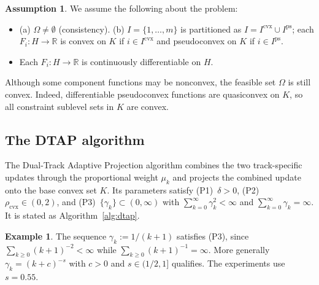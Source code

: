 \documentclass[]{interact}
\theoremstyle{plain}
\theoremstyle{definition}
\newtheorem{example}[theorem]{Example}
\newtheorem{assumption}{Assumption}
\theoremstyle{remark}
\newcommand{\R}{\mathbb{R}}
\newcommand{\cvx}{\mathrm{cvx}}
\newcommand{\ps}{\mathrm{ps}}
\begin{document}
\begin{assumption}\label{ass:standing}
We assume the following about the problem:
\begin{itemize}[leftmargin=2.4em,itemsep=2pt]
\item[\textup{(A1)}] \textup{(a)} $\Omega\ne\emptyset$ (consistency). \textup{(b)} $I=\{1,\dots,m\}$
is partitioned as $I=I^{\cvx}\cup I^{\ps}$; each $F_i:H\to\R$ is convex on $K$ if
$i\in I^{\cvx}$ and pseudoconvex on $K$ if $i\in I^{\ps}$.
\item[\textup{(A2)}] Each $F_i:H\to\R$ is continuously differentiable on $H$.
\end{itemize}
\end{assumption}
Although some component functions may be nonconvex, the feasible set $\Omega$ is still convex. Indeed, differentiable pseudoconvex functions are quasiconvex on $K$, so all constraint sublevel sets in $K$ are convex.

\subsection{The DTAP algorithm}\label{ssec:algorithm}
The Dual-Track Adaptive Projection algorithm combines the two track-specific updates through the proportional weight $\mu_k$ and projects the combined update onto the base convex set $K$. Its parameters satisfy \textup{(P1)}~$\delta>0$, \textup{(P2)}~$\rho_{\cvx}\in(0,2)$, and \textup{(P3)}~$\{\gamma_k\}\subset(0,\infty)$ with $\sum_{k=0}^\infty\gamma_k^2<\infty$ and $\sum_{k=0}^\infty\gamma_k=\infty$. It is stated as Algorithm~\ref{alg:dtap}.
\begin{example}\label{ex:gamma}
The sequence $\gamma_k:=1/(k+1)$ satisfies (P3), since $\sum_{k\ge0}(k+1)^{-2}<\infty$ while $\sum_{k\ge0}(k+1)^{-1}=\infty$. More generally $\gamma_k=(k+c)^{-s}$ with $c>0$ and $s\in(1/2,1]$ qualifies. The experiments use $s=0.55$.
\end{example}
\end{document}
